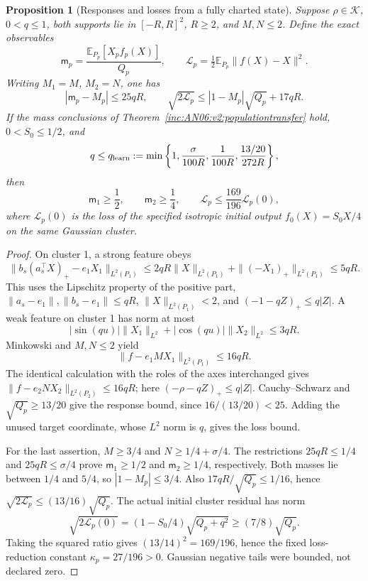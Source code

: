 \documentclass[11pt]{article}
\numberwithin{equation}{section}
\newtheorem{proposition}[theorem]{Proposition}
\theoremstyle{remark}\newtheorem{remark}[theorem]{Remark}
\newcommand{\E}{\mathbb E}
\newcommand{\1}{\mathbf 1}
\begin{document}
\begin{proposition}[Responses and losses from a fully charted state]
\label{inc:AN06:v2:staticproposition}
Suppose $\rho\in\mathcal K$, $0<q\le1$, both supports lie in $[-R,R]^2$,
$R\ge2$, and $M,N\le2$. Define the exact observables
\[
 \mathsf m_p=\frac{\E_{P_p}[X_pf_p(X)]}{Q_p},\qquad
 \mathcal L_p=\tfrac12\E_{P_p}\|f(X)-X\|^2.
\]
Writing $M_1=M$, $M_2=N$, one has
\begin{equation}\label{inc:AN06:v2:staticbounds}
 |\mathsf m_p-M_p|\le25qR,\qquad
 \sqrt{2\mathcal L_p}\le |1-M_p|\sqrt{Q_p}+17qR.
\end{equation}
If the mass conclusions of
Theorem~\ref{inc:AN06:v2:populationtransfer} hold, $0<S_0\le1/2$, and
\begin{equation}\label{inc:AN06:v2:qlearn}
 q\le q_{\rm learn}:=
 \min\left\{1,\frac{\sigma}{100R},\frac1{100R},
                  \frac{13/20}{272R}\right\},
\end{equation}
then
\begin{equation}\label{inc:AN06:v2:learningconclusion}
 \mathsf m_1\ge\frac12,\qquad \mathsf m_2\ge\frac14,\qquad
 \mathcal L_p\le\frac{169}{196}\mathcal L_p(0),
\end{equation}
where $\mathcal L_p(0)$ is the loss of the specified isotropic initial
output $f_0(X)=S_0X/4$ on the same Gaussian cluster.
\end{proposition}
\begin{proof}
On cluster 1, a strong feature obeys
\[
 \|b_s(a_s^\top X)_+-e_1X_1\|_{L^2(P_1)}
 \le2qR\|X\|_{L^2(P_1)}+\|(-X_1)_+\|_{L^2(P_1)}\le5qR.
\]
This uses the Lipschitz property of the positive part,
$\|a_s-e_1\|,\|b_s-e_1\|\le qR$,
$\|X\|_{L^2(P_1)}<2$, and
$(-1-qZ)_+\le q|Z|$.
A weak feature on cluster 1 has norm at most
\[
 |\sin(qu)|\|X_1\|_{L^2}+|\cos(qu)|\|X_2\|_{L^2}\le3qR.
\]
Minkowski and $M,N\le2$ yield
\[
 \|f-e_1MX_1\|_{L^2(P_1)}\le16qR.
\]
The identical calculation with the roles of the axes interchanged gives
$\|f-e_2NX_2\|_{L^2(P_2)}\le16qR$; here
$(-\rho-qZ)_+\le q|Z|$.
Cauchy--Schwarz and $\sqrt{Q_p}\ge13/20$ give the response bound,
since $16/(13/20)<25$. Adding the unused target coordinate, whose
$L^2$ norm is $q$, gives the loss bound.

For the last assertion, $M\ge3/4$ and $N\ge1/4+\sigma/4$.
The restrictions $25qR\le1/4$ and $25qR\le\sigma/4$ prove
$\mathsf m_1\ge1/2$ and $\mathsf m_2\ge1/4$, respectively.
Both masses lie between $1/4$ and $5/4$, so $|1-M_p|\le3/4$.
Also $17qR/\sqrt{Q_p}\le1/16$, hence
$\sqrt{2\mathcal L_p}\le(13/16)\sqrt{Q_p}$.
The actual initial cluster residual has norm
\[
 \sqrt{2\mathcal L_p(0)}=(1-S_0/4)\sqrt{Q_p+q^2}
 \ge(7/8)\sqrt{Q_p}.
\]
Taking the squared ratio gives $(13/14)^2=169/196$, hence the fixed
loss-reduction constant $\kappa_p=27/196>0$.
Gaussian negative tails were bounded, not declared zero.
\end{proof}
\end{document}
